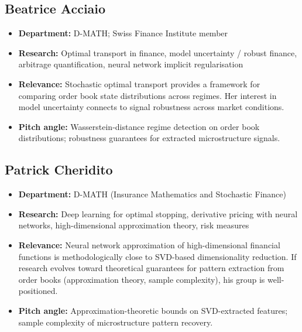 \documentclass[11pt,a4paper]{article}
\begin{document}
\subsection{Beatrice Acciaio}
\begin{itemize}
  \item \textbf{Department:} D-MATH; Swiss Finance Institute member
  \item \textbf{Research:} Optimal transport in finance, model uncertainty / robust finance, arbitrage quantification, neural network implicit regularisation
  \item \textbf{Relevance:} Stochastic optimal transport provides a framework for comparing order book state distributions across regimes. Her interest in model uncertainty connects to signal robustness across market conditions.
  \item \textbf{Pitch angle:} Wasserstein-distance regime detection on order book distributions; robustness guarantees for extracted microstructure signals.
\end{itemize}

\subsection{Patrick Cheridito}
\begin{itemize}
  \item \textbf{Department:} D-MATH (Insurance Mathematics and Stochastic Finance)
  \item \textbf{Research:} Deep learning for optimal stopping, derivative pricing with neural networks, high-dimensional approximation theory, risk measures
  \item \textbf{Relevance:} Neural network approximation of high-dimensional financial functions is methodologically close to SVD-based dimensionality reduction. If research evolves toward theoretical guarantees for pattern extraction from order books (approximation theory, sample complexity), his group is well-positioned.
  \item \textbf{Pitch angle:} Approximation-theoretic bounds on SVD-extracted features; sample complexity of microstructure pattern recovery.
\end{itemize}
\end{document}
